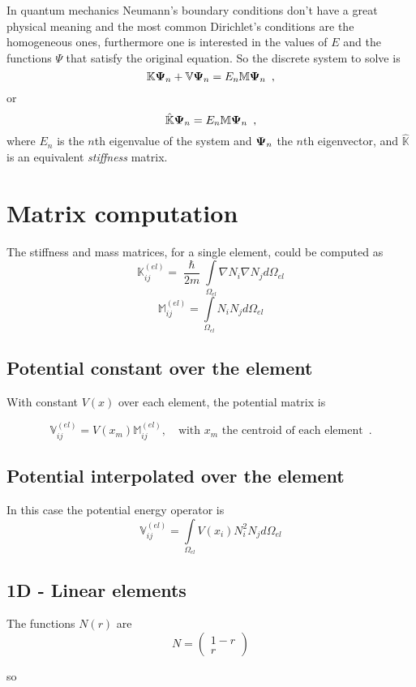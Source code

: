 \documentclass[12pt,letterpaper,final]{article}
\begin{document}
In quantum mechanics Neumann's boundary conditions don't have a great physical meaning and the
most common Dirichlet's conditions are the homogeneous ones, furthermore one is interested in the values of $E$ and the functions $\Psi$ that satisfy the original equation. So the discrete
system to solve is
\begin{equation}
\mathbb{K}\bold{\Psi}_n + \mathbb{V}\bold{\Psi}_n = E_n \mathbb{M}\bold{\Psi}_n \enspace ,
\end{equation}
or
\[ \hat{\mathbb{K}}\bold{\Psi}_n = E_n \mathbb{M}\bold{\Psi}_n \enspace , \]
where $E_n$ is the $n$th eigenvalue of the system and $\bold{\Psi}_n$ the $n$th eigenvector, and $\hat{\mathbb{K}}$ is an equivalent \emph{stiffness} matrix.

\section{Matrix computation}
The stiffness and mass matrices, for a single element, could be computed as
$$\mathbb{K}_{ij}^{(el)}= \frac{\hslash}{2m} \int\limits_{\Omega_{el}} \nabla N_i \nabla N_j d\Omega_{el}$$
$$\mathbb{M}_{ij}^{(el)}=\int\limits_{\Omega_{el}} N_i N_j d\Omega_{el}$$

\subsection{Potential constant over the element}
With constant $V(x)$ over each element, the potential matrix is

$$\mathbb{V}_{ij}^{(el)}=V(x_m)\mathbb{M}_{ij}^{(el)}, \quad \text{with }x_m\text{ the centroid of each element} \enspace .$$

\subsection{Potential interpolated over the element}
In this case the potential energy operator is 
$$\mathbb{V}_{ij}^{(el)} = \int\limits_{\Omega_{el}}V(x_i)N_i^2N_j d\Omega_{el}$$

\subsection{1D - Linear elements}
The functions $N(r)$ are
\[ N =
 \left(
   \begin{array}{c}
      1-r \\
      r
  \end{array}
\right )\]

so
\end{document}
